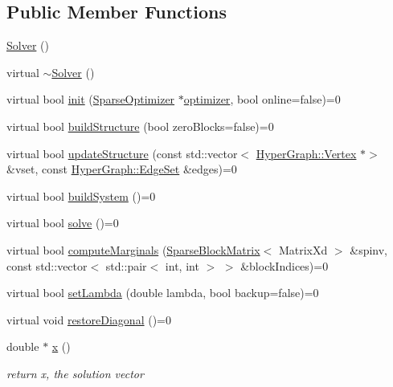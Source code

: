 \subsection*{Public Member Functions}
\begin{DoxyCompactItemize}
\item 
\mbox{\hyperlink{classg2o_1_1_solver_af097bdf5c8dc4bb017a2cec4038d5a56}{Solver}} ()
\item 
virtual \mbox{\hyperlink{classg2o_1_1_solver_a3b4a7c818ea0904772bc8bea6f1bbe86}{$\sim$\+Solver}} ()
\item 
virtual bool \mbox{\hyperlink{classg2o_1_1_solver_a532174e1ee53642880d2d59c128b037b}{init}} (\mbox{\hyperlink{classg2o_1_1_sparse_optimizer}{Sparse\+Optimizer}} $\ast$\mbox{\hyperlink{classg2o_1_1_solver_a266bc31d289e824de6166522579ed385}{optimizer}}, bool online=false)=0
\item 
virtual bool \mbox{\hyperlink{classg2o_1_1_solver_a6c93ac0f528ffe05867d33150c54f46f}{build\+Structure}} (bool zero\+Blocks=false)=0
\item 
virtual bool \mbox{\hyperlink{classg2o_1_1_solver_aeca71878e37081b6138f90ac60ec1f89}{update\+Structure}} (const std\+::vector$<$ \mbox{\hyperlink{classg2o_1_1_hyper_graph_1_1_vertex}{Hyper\+Graph\+::\+Vertex}} $\ast$$>$ \&vset, const \mbox{\hyperlink{classg2o_1_1_hyper_graph_a5e2970e236c0dcb4eff7c205d7b6b4ae}{Hyper\+Graph\+::\+Edge\+Set}} \&edges)=0
\item 
virtual bool \mbox{\hyperlink{classg2o_1_1_solver_ac1565e85d5ca68a87ad7f06f8164a8c0}{build\+System}} ()=0
\item 
virtual bool \mbox{\hyperlink{classg2o_1_1_solver_a9c359a886db57f2f81e54a2113f3bd38}{solve}} ()=0
\item 
virtual bool \mbox{\hyperlink{classg2o_1_1_solver_afc33768e6c024e11d9e3c9d938b59b7f}{compute\+Marginals}} (\mbox{\hyperlink{classg2o_1_1_sparse_block_matrix}{Sparse\+Block\+Matrix}}$<$ Matrix\+Xd $>$ \&spinv, const std\+::vector$<$ std\+::pair$<$ int, int $>$ $>$ \&block\+Indices)=0
\item 
virtual bool \mbox{\hyperlink{classg2o_1_1_solver_a94a0d5196c7859c6c37fc2368ac56be3}{set\+Lambda}} (double lambda, bool backup=false)=0
\item 
virtual void \mbox{\hyperlink{classg2o_1_1_solver_a3c40dae9b999c4d18e57b02fd0e0ade2}{restore\+Diagonal}} ()=0
\item 
double $\ast$ \mbox{\hyperlink{classg2o_1_1_solver_acb097d8568624a1f3af4dba808e5593b}{x}} ()
\begin{DoxyCompactList}\small\item\em return x, the solution vector \end{DoxyCompactList}\item 
$$
\end{DoxyCompactItemize}
